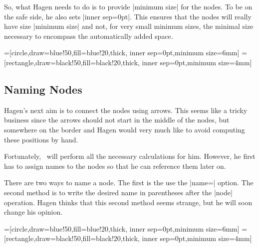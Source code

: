 So, what Hagen needs to do is to provide |minimum size| for the
nodes. To be on the safe side, he also sets |inner sep=0pt|. This
ensures that the nodes will really have size |minimum size| and not,
for very small minimum sizes, the minimal size necessary to encompass
the automatically added space.

\begin{codeexample}[]
=[circle,draw=blue!50,fill=blue!20,thick,
                   inner sep=0pt,minimum size=6mm]
=[rectangle,draw=black!50,fill=black!20,thick,
                        inner sep=0pt,minimum size=4mm]
\end{codeexample}




\subsection{Naming Nodes}

Hagen's next aim is to connect the nodes using arrows. This seems like
a tricky business since the arrows should not start in the middle of
the nodes, but somewhere on the border and Hagen would very much like
to avoid computing these positions by hand.

Fortunately, \pgfname\ will perform all the necessary calculations for
him. However, he first has to assign names to the nodes so that he can
reference them later on.

There are two ways to name a node. The first is the use the |name=|
option. The second method is to write the desired name in parentheses
after the |node| operation. Hagen thinks that this second method seems
strange, but he will soon change his opinion.

{
=[circle,draw=blue!50,fill=blue!20,thick,
                   inner sep=0pt,minimum size=6mm]
=[rectangle,draw=black!50,fill=black!20,thick,
                        inner sep=0pt,minimum size=4mm]
\begin{codeexample}[]
\end{codeexample}
}

